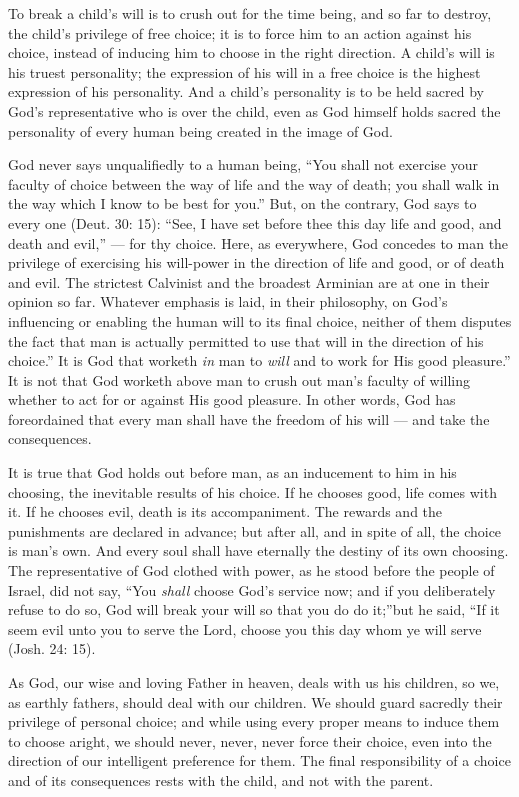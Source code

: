\documentclass[
]{book}
\begin{document}
To break a child's will is to crush out for the time being, and so far to destroy, the child's privilege of free choice; it is to force him to an action against his choice, instead of inducing him to choose in the right direction. A child's will is his truest personality; the expression of his will in a free choice is the highest expression of his personality. And a child's personality is to be held sacred by God's representative who is over the child, even as God himself holds sacred the personality of every human being created in the image of God.

God never says unqualifiedly to a human being, ``You shall not exercise your faculty of choice between the way of life and the way of death; you shall walk in the way which I know to be best for you.'' But, on the contrary, God says to every one (Deut. 30: 15): ``See, I have set before thee this day life and good, and death and evil,'' --- for thy choice. Here, as everywhere, God concedes to man the privilege of exercising his will-power in the direction of life and good, or of death and evil. The strictest Calvinist and the broadest Arminian are at one in their opinion so far. Whatever emphasis is laid, in their philosophy, on God's influencing or enabling the human will to its final choice, neither of them disputes the fact that man is actually permitted to use that will in the direction of his choice.'' It is God that worketh \emph{in} man to \emph{will} and to work for His good pleasure.'' It is not that God worketh above man to crush out man's faculty of willing whether to act for or against His good pleasure. In other words, God has foreordained that every man shall have the freedom of his will --- and take the consequences.

It is true that God holds out before man, as an inducement to him in his choosing, the inevitable results of his choice. If he chooses good, life comes with it. If he chooses evil, death is its accompaniment. The rewards and the punishments are declared in advance; but after all, and in spite of all, the choice is man's own. And every soul shall have eternally the destiny of its own choosing. The representative of God clothed with power, as he stood before the people of Israel, did not say, ``You \emph{shall} choose God's service now; and if you deliberately refuse to do so, God will break your will so that you do do it;''but he said, ``If it seem evil unto you to serve the Lord, choose you this day whom ye will serve (Josh. 24: 15).

As God, our wise and loving Father in heaven, deals with us his children, so we, as earthly fathers, should deal with our children. We should guard sacredly their privilege of personal choice; and while using every proper means to induce them to choose aright, we should never, never, never force their choice, even into the direction of our intelligent preference for them. The final responsibility of a choice and of its consequences rests with the child, and not with the parent.
\end{document}
